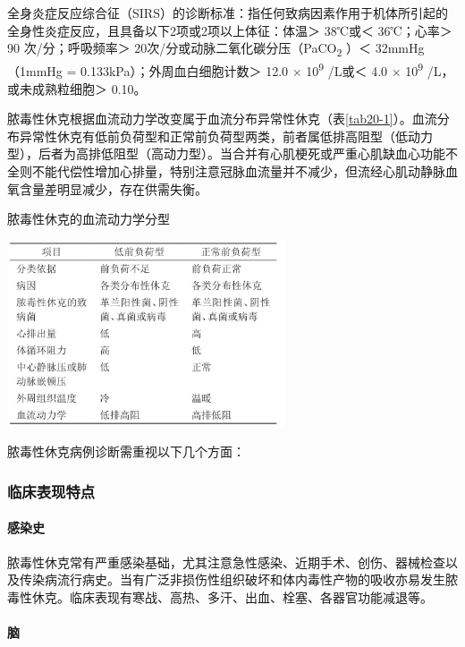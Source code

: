 全身炎症反应综合征（SIRS）的诊断标准：指任何致病因素作用于机体所引起的全身性炎症反应，且具备以下2项或2项以上体征：体温＞
38℃或＜ 36℃；心率＞ 90 次/分；呼吸频率＞
20次/分或动脉二氧化碳分压（PaCO\textsubscript{2} ）＜ 32mmHg（1mmHg =
0.133kPa）；外周血白细胞计数＞ 12.0 × 10\textsuperscript{9} /L或＜ 4.0 ×
10\textsuperscript{9} /L，或未成熟粒细胞＞ 0.10。

脓毒性休克根据血流动力学改变属于血流分布异常性休克（表\ref{tab20-1}）。血流分布异常性休克有低前负荷型和正常前负荷型两类，前者属低排高阻型（低动力型），后者为高排低阻型（高动力型）。当合并有心肌梗死或严重心肌缺血心功能不全则不能代偿性增加心排量，特别注意冠脉血流量并不减少，但流经心肌动静脉血氧含量差明显减少，存在供需失衡。

\begin{table}[htbp]
\centering
\caption{脓毒性休克的血流动力学分型}
\label{tab20-1}
\includegraphics[width=3.25in,height=2.16667in]{./images/Image00084.jpg}
\end{table}

脓毒性休克病例诊断需重视以下几个方面：

\subsubsection{临床表现特点}

\paragraph{感染史}

脓毒性休克常有严重感染基础，尤其注意急性感染、近期手术、创伤、器械检查以及传染病流行病史。当有广泛非损伤性组织破坏和体内毒性产物的吸收亦易发生脓毒性休克。临床表现有寒战、高热、多汗、出血、栓塞、各器官功能减退等。

\paragraph{脑}

